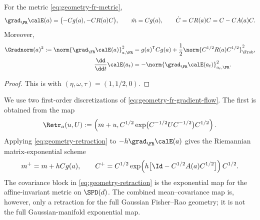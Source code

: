 \begin{proposition}
\label{prop:geometry-fr-flow}
For the metric \eqref{eq:geometry-fr-metric},
\begin{equation}
\label{eq:geometry-fr-gradient-flow}
    \grad_{\FR}\calE(a)=\bigl(-Cg(a),-CR(a)C\bigr),
    \qquad
    \dot m=Cg(a),
    \qquad
    \dot C=CR(a)C=C-CA(a)C.
\end{equation}
Moreover,
\begin{equation}
\label{eq:geometry-fr-dissipation}
\begin{aligned}
    \Gradnorm(a)^2
    :=\norm{\grad_{\FR}\calE(a)}_{a,\FR}^2
    &=g(a)^{\mathsf T}Cg(a)
      +\frac12\norm{C^{1/2}R(a)C^{1/2}}_{\Frob}^2,\\
    \frac{\dd}{\dd t}\calE(a_t)
    &=-\norm{\grad_{\FR}\calE(a_t)}_{a_t,\FR}^2.
\end{aligned}
\end{equation}
\end{proposition}

\begin{proof}
This is  with
$(\eta,\omega,\tau)=(1,1/2,0)$.
\end{proof}

We use two first-order discretizations of
\eqref{eq:geometry-fr-gradient-flow}.  The first is obtained from the map
\begin{equation}
\label{eq:geometry-retraction}
    \Retr_a(u,U)
    :=\left(m+u,
      C^{1/2}\exp\bigl(C^{-1/2}UC^{-1/2}\bigr)C^{1/2}\right).
\end{equation}
Applying \eqref{eq:geometry-retraction} to
$-h\grad_{\FR}\calE(a)$ gives the Riemannian matrix-exponential scheme
\begin{equation}
\label{eq:geometry-riemannian-step}
    m^+=m+hCg(a),
    \qquad
    C^+=C^{1/2}\exp\!\left(
       h\bigl[\Id-C^{1/2}A(a)C^{1/2}\bigr]
       \right)C^{1/2}.
\end{equation}
The covariance block in \eqref{eq:geometry-retraction} is the exponential
map for the affine-invariant metric on $\SPD(d)$.  The combined mean--covariance
map is, however, only a retraction for the full Gaussian Fisher--Rao
geometry; it is not the full Gaussian-manifold exponential map.

